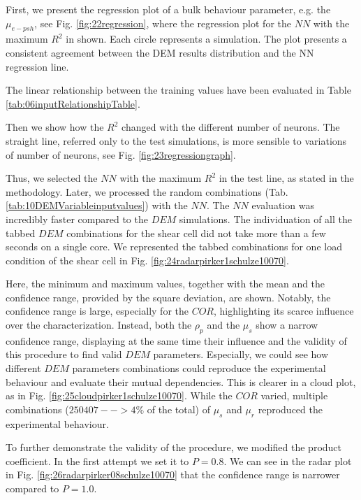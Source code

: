 First, we present the regression plot of a bulk behaviour parameter, e.g. the
$\mu_{e-psh}$, see Fig. \ref{fig:22regression}, where the regression plot for
the $NN$ with the maximum $R^2$ in shown. Each circle represents a simulation. 
The plot presents a consistent agreement between the DEM results distribution and the NN regression line.

The linear relationship between the
training values have been evaluated in Table \ref{tab:06inputRelationshipTable}.

Then we show how the $R^2$ changed with the different number of neurons. The
straight line, referred only to the test simulations, is more sensible to
variations of number of neurons, see Fig. \ref{fig:23regressiongraph}.

Thus, we selected the $NN$ with the maximum $R^2$ in the test line, as stated in the methodology.
Later, we processed the random combinations (Tab.
\ref{tab:10DEMVariableinputvalues}) with the $NN$.
The $NN$ evaluation was incredibly faster compared to the $DEM$ simulations. The
individuation of all the tabbed $DEM$ combinations for the shear cell did not take more than a few seconds on a single core. 
We represented the tabbed combinations for one load condition of the shear cell in Fig.
\ref{fig:24radarpirker1schulze10070}.

Here, the minimum and maximum values, together with the mean and the confidence
range, provided by the square deviation, are shown. Notably, the confidence range is large, 
especially for the $COR$, highlighting its scarce influence over the characterization. 
Instead, both the $\rho_p$  and the $\mu_s$ show a narrow confidence range, 
displaying at the same time their influence and the validity of this procedure to find valid $DEM$ parameters. 
Especially, we could see how different $DEM$ parameters combinations could reproduce the experimental 
behaviour and evaluate their mutual dependencies. 
This is clearer in a cloud plot, as in Fig. 
\ref{fig:25cloudpirker1schulze10070}. While the $COR$ varied, multiple
combinations ($250407 --> 4\% $ of the total) of $\mu_s$ and $\mu_r$ reproduced
the experimental behaviour.

To further demonstrate the validity of the procedure, we modified the product
coefficient. In the first attempt we set it to $P=0.8$. We can see in the radar plot in Fig. 
\ref{fig:26radarpirker08schulze10070} that the confidence range is narrower
compared to $P=1.0$.












